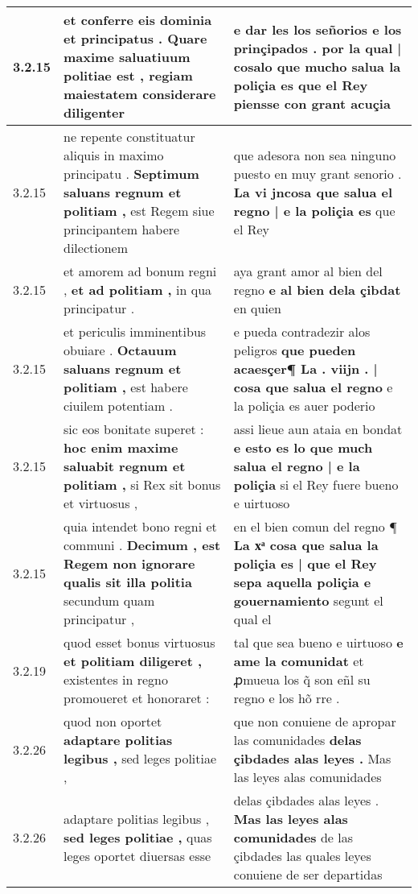 \begin{tabular}{|p{1cm}|p{6.5cm}|p{6.5cm}|}
3.2.15 & et conferre eis dominia et principatus . \textbf{ Quare maxime saluatiuum politiae est , } regiam maiestatem considerare diligenter & e dar les los señorios e los prinçipados . \textbf{ por la qual | cosalo que mucho salua la poliçia } es que el Rey piensse con grant acuçia \\\hline
3.2.15 & ne repente constituatur aliquis in maximo principatu . \textbf{ Septimum saluans regnum et politiam , } est Regem siue principantem habere dilectionem & que adesora non sea ninguno puesto en muy grant senorio . \textbf{ La vi jncosa que salua el regno | e la poliçia es } que el Rey \\\hline
3.2.15 & et amorem ad bonum regni , \textbf{ et ad politiam , } in qua principatur . & aya grant amor al bien del regno \textbf{ e al bien dela çibdat } en quien \\\hline
3.2.15 & et periculis imminentibus obuiare . \textbf{ Octauum saluans regnum et politiam , } est habere ciuilem potentiam . & e pueda contradezir alos peligros \textbf{ que pueden acaesçer¶ La . viijn . | cosa que salua el regno } e la poliçia es auer poderio \\\hline
3.2.15 & sic eos bonitate superet : \textbf{ hoc enim maxime saluabit regnum et politiam , } si Rex sit bonus et virtuosus , & assi lieue aun ataia en bondat \textbf{ e esto es lo que much salua el regno | e la poliçia } si el Rey fuere bueno e uirtuoso \\\hline
3.2.15 & quia intendet bono regni et communi . \textbf{ Decimum , est Regem non ignorare qualis sit illa politia } secundum quam principatur , & en el bien comun del regno ¶ \textbf{ La xͣ cosa que salua la poliçia es | que el Rey sepa aquella poliçia e gouernamiento } segunt el qual el \\\hline
3.2.19 & quod esset bonus virtuosus \textbf{ et politiam diligeret , } existentes in regno promoueret et honoraret : & tal que sea bueno e uirtuoso \textbf{ e ame la comunidat } et ꝓmueua los q̃ son eñl su regno e los hõ rre . \\\hline
3.2.26 & quod non oportet \textbf{ adaptare politias legibus , } sed leges politiae , & que non conuiene de apropar las comunidades \textbf{ delas çibdades alas leyes . } Mas las leyes alas comunidades \\\hline
3.2.26 & adaptare politias legibus , \textbf{ sed leges politiae , } quas leges oportet diuersas esse & delas çibdades alas leyes . \textbf{ Mas las leyes alas comunidades } de las çibdades las quales leyes conuiene de ser departidas \\\hline

\end{tabular}
